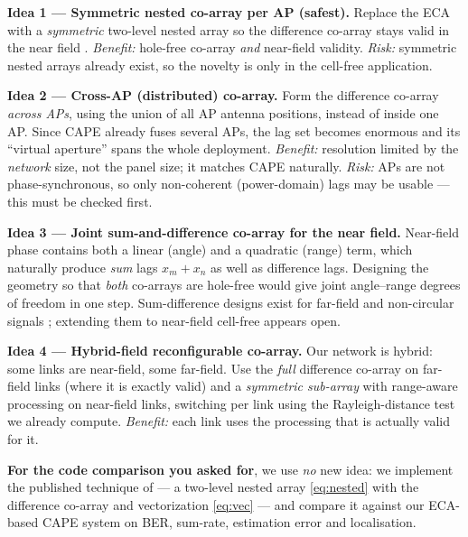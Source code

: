 \documentclass[11pt]{article}
\begin{document}
\begin{ideabox}
\textbf{Idea 1 --- Symmetric nested co-array per AP (safest).}
Replace the ECA with a \emph{symmetric} two-level nested array so the difference co-array stays valid
in the near field \cite{wang2016csna,zhang2019symdouble}. \emph{Benefit:} hole-free co-array
\emph{and} near-field validity. \emph{Risk:} symmetric nested arrays already exist, so the novelty is
only in the cell-free application.
\end{ideabox}

\begin{ideabox}
\textbf{Idea 2 --- Cross-AP (distributed) co-array.}
Form the difference co-array \emph{across APs}, using the union of all AP antenna positions, instead
of inside one AP. Since CAPE already fuses several APs, the lag set becomes enormous and its
``virtual aperture'' spans the whole deployment. \emph{Benefit:} resolution limited by the
\emph{network} size, not the panel size; it matches CAPE naturally. \emph{Risk:} APs are not
phase-synchronous, so only non-coherent (power-domain) lags may be usable --- this must be checked
first.
\end{ideabox}

\begin{ideabox}
\textbf{Idea 3 --- Joint sum-and-difference co-array for the near field.}
Near-field phase contains both a linear (angle) and a quadratic (range) term, which naturally produce
\emph{sum} lags $x_{m}+x_{n}$ as well as difference lags. Designing the geometry so that
\emph{both} co-arrays are hole-free would give joint angle--range degrees of freedom in one step.
Sum-difference designs exist for far-field and non-circular signals
\cite{zhou2020revshift,shi2025noncirc}; extending them to near-field cell-free appears open.
\end{ideabox}

\begin{ideabox}
\textbf{Idea 4 --- Hybrid-field reconfigurable co-array.}
Our network is hybrid: some links are near-field, some far-field. Use the \emph{full} difference
co-array on far-field links (where it is exactly valid) and a \emph{symmetric sub-array} with
range-aware processing on near-field links, switching per link using the Rayleigh-distance test we
already compute. \emph{Benefit:} each link uses the processing that is actually valid for it.
\end{ideabox}

\begin{keybox}
\textbf{For the code comparison you asked for}, we use \emph{no} new idea: we implement the published
technique of \cite{pinto2023sra} --- a two-level nested array \eqref{eq:nested} with the difference
co-array and vectorization \eqref{eq:vec} --- and compare it against our ECA-based CAPE system on
BER, sum-rate, estimation error and localisation.
\end{keybox}
\end{document}
